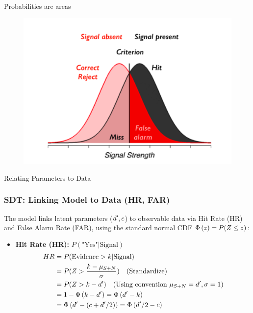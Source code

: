 \documentclass[aspectratio=169]{beamer}
\begin{document}
\begin{frame}{Probabilities are areas}
    \begin{figure}
        \centering
        \includegraphics[width=.75\textwidth]{figures/area.pdf}
    \end{figure}
\end{frame}

\begin{frame}{Relating Parameters to Data}
  \frametitle{SDT: Linking Model to Data (HR, FAR)}
  The model links latent parameters ($d', c$) to observable data via Hit Rate (HR) and False Alarm Rate (FAR), using the standard normal CDF $\Phi\left(z\right) = P(Z \le z)$:
  \pause
  \begin{itemize}
    \item \textbf{Hit Rate (HR):} $P(\text{"Yes"} | \text{Signal})$
    \begin{align*}
      HR &= P(\text{Evidence} > k | \text{Signal}) \\
         &= P(Z > \frac{k - \mu_{S+N}}{\sigma}) \quad \text{(Standardize)}\\
         &= P(Z > k - d') \quad \text{(Using convention $\mu_{S+N}=d', \sigma=1$)}\\
         &= 1 - \Phi\left(k - d'\right) = \Phi\left(d' - k\right) \\
         &= \Phi\left(d' - (c + d'/2)\right) = \Phi\left(d'/2 - c\right)
    \end{align*}
  \end{itemize}
\end{frame}
\end{document}
